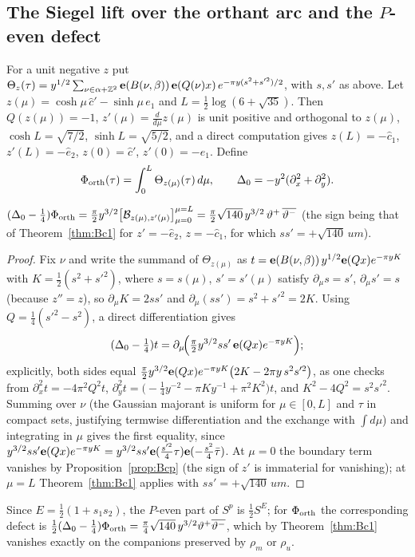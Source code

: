 \subsection{The Siegel lift over the orthant arc and the $P$-even defect}
For a unit negative $z$ put $\Theta_z(\tau)=y^{1/2}\sum_{\nu\in\alpha+\mathbb{Z}^2}\mathbf{e}(B(\nu,\beta))\,\mathbf{e}(Q(\nu)x)\,e^{-\pi y(s^2+s'^2)/2}$, with $s,s'$ as above. Let
$z(\mu)=\cosh\mu\,\hat c'-\sinh\mu\,e_1$ and $L=\frac12\log(6+\sqrt{35})$. Then $Q(z(\mu))=-1$, $z'(\mu)=\frac{d}{d\mu}z(\mu)$ is unit positive and orthogonal to $z(\mu)$,
$\cosh L=\sqrt{7/2}$, $\sinh L=\sqrt{5/2}$, and a direct computation gives $z(L)=-\hat c_1$, $z'(L)=-\hat e_2$, $z(0)=\hat c'$, $z'(0)=-e_1$. Define
\[ \Phi_{\rm orth}(\tau)=\int_0^L\Theta_{z(\mu)}(\tau)\,d\mu,\qquad \Delta_0=-y^2(\partial_x^2+\partial_y^2). \]
\begin{theorem}\label{thm:lap}
$(\Delta_0-\frac14)\Phi_{\rm orth}=\frac\pi2y^{3/2}\big[\mathcal B_{z(\mu),z'(\mu)}\big]_{\mu=0}^{\mu=L}=\frac\pi2\sqrt{140}\,y^{3/2}\,\vartheta^+\,\overline{\vartheta^-}$ (the
sign being that of Theorem~\ref{thm:Bc1} for $z'=-\hat e_2$, $z=-\hat c_1$, for which $ss'=+\sqrt{140}\,um$).
\end{theorem}
\begin{proof}
Fix $\nu$ and write the summand of $\Theta_{z(\mu)}$ as $t=\mathbf{e}(B(\nu,\beta))\,y^{1/2}\mathbf{e}(Qx)e^{-\pi yK}$ with $K=\frac12(s^2+s'^2)$, where $s=s(\mu)$, $s'=s'(\mu)$ satisfy $\partial_\mu s=s'$, $\partial_\mu s'=s$
(because $z''=z$), so $\partial_\mu K=2ss'$ and $\partial_\mu(ss')=s^2+s'^2=2K$. Using $Q=\frac14(s'^2-s^2)$, a direct differentiation gives
\[ (\Delta_0-\tfrac14)t=\partial_\mu\!\Big(\tfrac\pi2y^{3/2}ss'\,\mathbf{e}(Qx)e^{-\pi yK}\Big); \]
explicitly, both sides equal $\frac\pi2y^{3/2}\mathbf{e}(Qx)e^{-\pi yK}\big(2K-2\pi y\,s^2s'^2\big)$, as one checks from $\partial_x^2t=-4\pi^2Q^2t$,
$\partial_y^2t=\big(-\frac14y^{-2}-\pi Ky^{-1}+\pi^2K^2\big)t$, and $K^2-4Q^2=s^2s'^2$. Summing over $\nu$ (the Gaussian majorant is uniform for $\mu\in[0,L]$ and $\tau$ in compact
sets, justifying termwise differentiation and the exchange with $\int d\mu$) and integrating in $\mu$ gives the first equality, since
$y^{3/2}ss'\mathbf{e}(Qx)e^{-\pi yK}=y^{3/2}ss'\mathbf{e}(\frac{s'^2}4\tau)\mathbf{e}(-\frac{s^2}4\bar\tau)$. At $\mu=0$ the boundary term vanishes by Proposition~\ref{prop:Bcp} (the sign of $z'$
is immaterial for vanishing); at $\mu=L$ Theorem~\ref{thm:Bc1} applies with $ss'=+\sqrt{140}\,um$.
\end{proof}
Since $E=\frac12(1+s_1s_2)$, the $P$-even part of $S^p$ is $\frac12S^E$; for $\Phi_{\rm orth}$ the corresponding defect is $\frac12(\Delta_0-\frac14)\Phi_{\rm orth}=
\frac\pi4\sqrt{140}\,y^{3/2}\vartheta^+\overline{\vartheta^-}$, which by Theorem~\ref{thm:Bc1} vanishes exactly on the companions preserved by $\rho_m$ or $\rho_u$.

